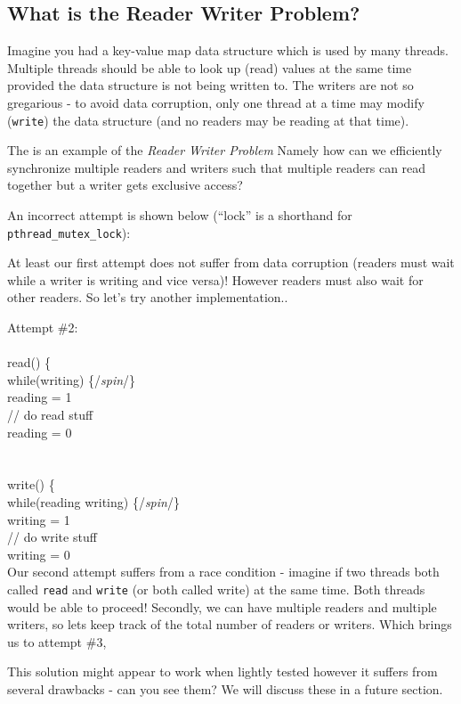 \subsection{What is the Reader Writer
Problem?}\label{what-is-the-reader-writer-problem}

Imagine you had a key-value map data structure which is used by many
threads. Multiple threads should be able to look up (read) values at the
same time provided the data structure is not being written to. The
writers are not so gregarious - to avoid data corruption, only one
thread at a time may modify (\texttt{write}) the data structure (and no
readers may be reading at that time).

The is an example of the \emph{Reader Writer Problem} Namely how can we
efficiently synchronize multiple readers and writers such that multiple
readers can read together but a writer gets exclusive access?

An incorrect attempt is shown below (``lock'' is a shorthand for
\texttt{pthread\_mutex\_lock}):

At least our first attempt does not suffer from data corruption (readers
must wait while a writer is writing and vice versa)! However readers
must also wait for other readers. So let's try another implementation..

Attempt \#2:\\\\read() \{\\ while(writing) \{/\emph{spin}/\}\\ reading =
1\\ // do read stuff\\ reading = 0\\\\\\write() \{\\ while(reading
\textbar{}\textbar{} writing) \{/\emph{spin}/\}\\ writing = 1\\ // do
write stuff\\ writing = 0\\

Our second attempt suffers from a race condition - imagine if two
threads both called \texttt{read} and \texttt{write} (or both called
write) at the same time. Both threads would be able to proceed!
Secondly, we can have multiple readers and multiple writers, so lets
keep track of the total number of readers or writers. Which brings us to
attempt \#3,

This solution might appear to work when lightly tested however it
suffers from several drawbacks - can you see them? We will discuss these
in a future section.

